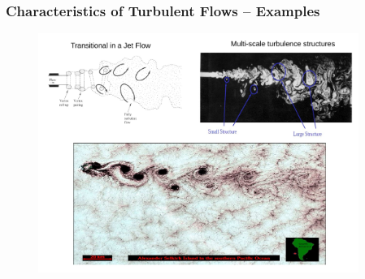\documentclass[10pt,compress,handout,ignorenonframetext]{beamer}
\begin{document}
\begin{frame}
 \frametitle{Characteristics of Turbulent Flows -- Examples}

   \begin{figure}%
    \begin{center}
     \includegraphics[width=12.cm, height=7.8cm, clip]{./Figs/Turbulence_Examples}
    \end{center}
   \end{figure}    
\end{frame}

\end{document}
